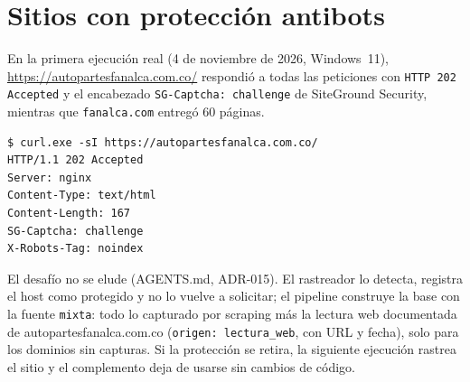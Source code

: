 \section{Sitios con protección antibots}\label{sec:antibots}
En la primera ejecución real (4 de noviembre de 2026, Windows~11), \url{https://autopartesfanalca.com.co/}
respondió a todas las peticiones con \texttt{HTTP 202 Accepted} y el encabezado \texttt{SG-Captcha: challenge}
de SiteGround Security, mientras que \texttt{fanalca.com} entregó 60 páginas.
\begin{lstlisting}[style=txt]
$ curl.exe -sI https://autopartesfanalca.com.co/
HTTP/1.1 202 Accepted
Server: nginx
Content-Type: text/html
Content-Length: 167
SG-Captcha: challenge
X-Robots-Tag: noindex
\end{lstlisting}
El desafío no se elude (AGENTS.md, ADR-015). El rastreador lo detecta, registra el host como protegido y no lo
vuelve a solicitar; el pipeline construye la base con la fuente \texttt{mixta}: todo lo capturado por scraping
más la lectura web documentada de autopartesfanalca.com.co (\texttt{origen: lectura\_web}, con URL y fecha), solo
para los dominios sin capturas. Si la protección se retira, la siguiente ejecución rastrea el sitio y el
complemento deja de usarse sin cambios de código.

